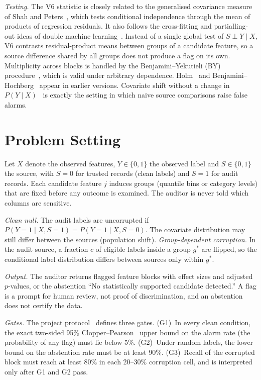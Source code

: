 \documentclass[conference]{IEEEtran}
\newcommand{\Vsix}{V6}
\begin{document}
\emph{Testing.} The \Vsix{} statistic is closely related to the generalised covariance measure of Shah and Peters~\cite{shah2020hardness}, which tests conditional independence through the mean of products of regression residuals. It also follows the cross-fitting and partialling-out ideas of double machine learning~\cite{chernozhukov2018double,robinson1988root}. Instead of a single global test of $S \perp Y \mid X$, \Vsix{} contrasts residual-product means between groups of a candidate feature, so a source difference shared by all groups does not produce a flag on its own. Multiplicity across blocks is handled by the Benjamini--Yekutieli (BY) procedure~\cite{benjamini2001control}, which is valid under arbitrary dependence. Holm~\cite{holm1979simple} and Benjamini--Hochberg~\cite{benjamini1995controlling} appear in earlier versions. Covariate shift without a change in $P(Y\mid X)$~\cite{shimodaira2000improving} is exactly the setting in which naive source comparisons raise false alarms.

\section{Problem Setting}
Let $X$ denote the observed features, $Y\in\{0,1\}$ the observed label and $S\in\{0,1\}$ the source, with $S=0$ for trusted records (clean labels) and $S=1$ for audit records. Each candidate feature $j$ induces groups (quantile bins or category levels) that are fixed before any outcome is examined. The auditor is never told which columns are sensitive.

\emph{Clean null.} The audit labels are uncorrupted if $P(Y{=}1\mid X,S{=}1)=P(Y{=}1\mid X,S{=}0)$. The covariate distribution may still differ between the sources (population shift). \emph{Group-dependent corruption.} In the audit source, a fraction $c$ of eligible labels inside a group $g^\ast$ are flipped, so the conditional label distribution differs between sources only within $g^\ast$.

\emph{Output.} The auditor returns flagged feature blocks with effect sizes and adjusted $p$-values, or the abstention ``No statistically supported candidate detected.'' A flag is a prompt for human review, not proof of discrimination, and an abstention does not certify the data.

\emph{Gates.} The project protocol~\cite{salwan2026report} defines three gates. (G1)~In every clean condition, the exact two-sided 95\% Clopper--Pearson~\cite{clopper1934use} upper bound on the alarm rate (the probability of any flag) must lie below 5\%. (G2)~Under random labels, the lower bound on the abstention rate must be at least 90\%. (G3)~Recall of the corrupted block must reach at least 80\% in each 20--30\% corruption cell, and is interpreted only after G1 and G2 pass.
\end{document}
